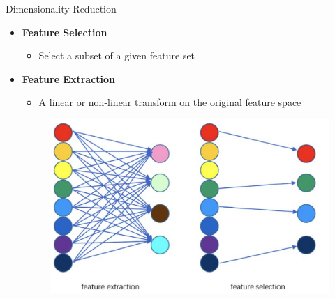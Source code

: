 \documentclass[serif, aspectratio=169]{beamer}
\begin{document}
\begin{frame}{Dimensionality Reduction }
    \begin{itemize}
        \item \textbf{Feature Selection}
            \begin{itemize}
                \item Select a subset of a given feature set
            \end{itemize}

         \item \textbf{Feature Extraction}
            \begin{itemize}
                \item A linear or non-linear transform on the original feature space
            \end{itemize}
            \begin{figure}[htpb]
                \begin{center}
                    \includegraphics[keepaspectratio, scale=0.25]{pic/FS-FE.png}
                \end{center}
            \end{figure}
    \end{itemize}
\end{frame}
\end{document}

